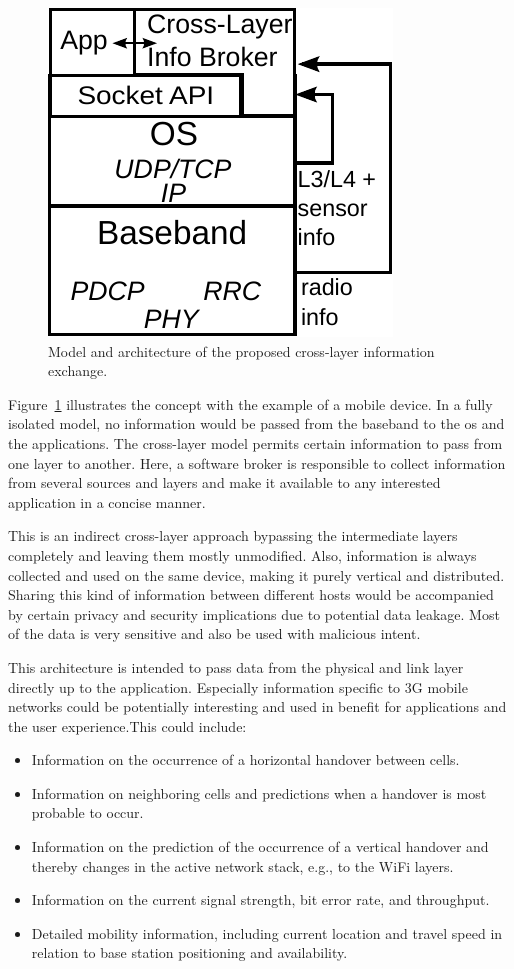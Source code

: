 \begin{figure}[htb]
	\centering
	\includegraphics{images/cross-layer-model.pdf}
	\caption{Model and architecture of the proposed cross-layer information exchange.}
\label{c5:fig:crosslayer-model}
\end{figure}

Figure~\ref{c5:fig:crosslayer-model} illustrates the concept with the example of a mobile device. In a fully isolated model, no information would be passed from the baseband to the \gls{os} and the applications. The cross-layer model permits certain information to pass from one layer to another. Here, a software broker is responsible to collect information from several sources and layers and make it available to any interested application in a concise manner. 

This is an indirect cross-layer approach bypassing the intermediate layers completely and leaving them mostly unmodified. Also, information is always collected and used on the same device, making it purely vertical and distributed. Sharing this kind of information between different hosts would be accompanied by certain privacy and security implications due to potential data leakage. Most of the data is very sensitive and also be used with malicious intent.

This architecture is intended to pass data from the physical and link layer directly up to the application. Especially information specific to \gls{3G} mobile networks could be potentially interesting and used in benefit for applications and the user experience.This could include:

\begin{itemize}
	\item Information on the occurrence of a horizontal handover between cells.
	\item Information on neighboring cells and predictions when a handover is most probable to occur.
	\item Information on the prediction of the occurrence of a vertical handover and thereby changes in the active network stack, e.g., to the WiFi layers.
	\item Information on the current signal strength, bit error rate, and throughput.
	\item Detailed mobility information, including current location and travel speed in relation to base station positioning and availability.
\end{itemize}

